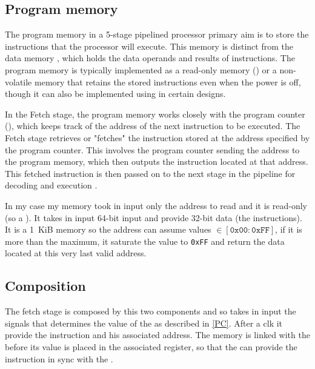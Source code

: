 \documentclass{article}
\begin{document}
\subsection{Program memory}\label{P_MEM}
The program memory in a 5-stage pipelined \RISCV processor primary aim is to store the instructions that the processor will execute. This memory is distinct from the data memory , which holds the data operands and results of instructions. The program memory is typically implemented as a read-only memory (\ROM) or a non-volatile memory that retains the stored instructions even when the power is off, though it can also be implemented using \RAM in certain designs.

In the Fetch stage, the program memory works closely with the program counter (\PC), which keeps track of the address of the next instruction to be executed. The Fetch stage retrieves or "fetches" the instruction stored at the address specified by the program counter. This involves the program counter sending the address to the program memory, which then outputs the instruction located at that address. This fetched instruction is then passed on to the next stage in the pipeline for decoding and execution \cite{chatgpt}.

In my case my memory took in input only the address to read and it is read-only (so a \ROM). It takes in input 64-bit input and provide 32-bit data (the instructions). It is a \SI{1}{KiB} memory so the address can assume values $\in [\texttt{0x00}:\texttt{0xFF}]$, if it is more than the maximum, it saturate the value to \texttt{0xFF} and return the data located at this very last valid address.
    
\subsection*{Composition}

The fetch stage is composed by this two components and so takes in input the signals that determines the value of the \PC as described in \ref{PC}. After a \gls{clk} it provide the instruction and his associated address. The memory is linked with the \PC before its value is placed in the associated register, so that the \ROM can provide the instruction in sync with the \PC.
\end{document}

